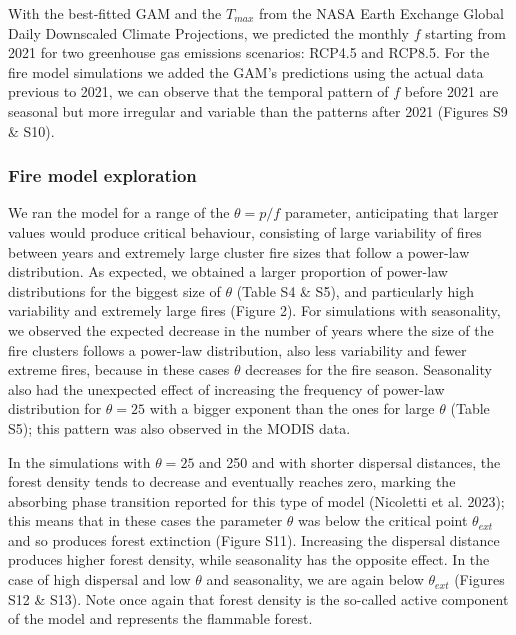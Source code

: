 \documentclass[
]{article}
\begin{document}
With the best-fitted GAM and the \(T_{max}\) from the NASA Earth
Exchange Global Daily Downscaled Climate Projections, we predicted the
monthly \(f\) starting from 2021 for two greenhouse gas emissions
scenarios: RCP4.5 and RCP8.5. For the fire model simulations we added
the GAM's predictions using the actual data previous to 2021, we can
observe that the temporal pattern of \(f\) before 2021 are seasonal but
more irregular and variable than the patterns after 2021 (Figures S9 \&
S10).

\subsubsection{Fire model exploration}\label{fire-model-exploration}

We ran the model for a range of the \(\theta = p/f\) parameter,
anticipating that larger values would produce critical behaviour,
consisting of large variability of fires between years and extremely
large cluster fire sizes that follow a power-law distribution. As
expected, we obtained a larger proportion of power-law distributions for
the biggest size of \(\theta\) (Table S4 \& S5), and particularly high
variability and extremely large fires (Figure 2). For simulations with
seasonality, we observed the expected decrease in the number of years
where the size of the fire clusters follows a power-law distribution,
also less variability and fewer extreme fires, because in these cases
\(\theta\) decreases for the fire season. Seasonality also had the
unexpected effect of increasing the frequency of power-law distribution
for \(\theta = 25\) with a bigger exponent than the ones for large
\(\theta\) (Table S5); this pattern was also observed in the MODIS data.

In the simulations with \(\theta = 25\) and 250 and with shorter
dispersal distances, the forest density tends to decrease and eventually
reaches zero, marking the absorbing phase transition reported for this
type of model (Nicoletti et al. 2023); this means that in these cases
the parameter \(\theta\) was below the critical point \(\theta_{ext}\)
and so produces forest extinction (Figure S11). Increasing the dispersal
distance produces higher forest density, while seasonality has the
opposite effect. In the case of high dispersal and low \(\theta\) and
seasonality, we are again below \(\theta_{ext}\) (Figures S12 \& S13).
Note once again that forest density is the so-called active component of
the model and represents the flammable forest.
\end{document}
